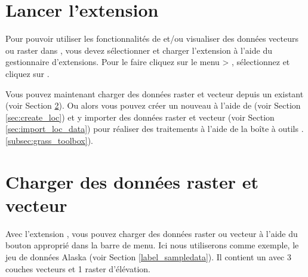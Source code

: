 \section{Lancer l'extension \grass}\label{sec:starting_grass}


Pour pouvoir utiliser les fonctionnalités de \grass et/ou visualiser des données vecteurs ou raster dans \qg, 
vous devez sélectionner et charger l'extension \grass à l'aide du gestionnaire d'extensions. 
Pour le faire cliquez sur le menu  > , 
sélectionnez \dropmenuopt{\grass} et cliquez sur .


Vous pouvez maintenant charger des données raster et vecteur depuis un  \grass existant (voir Section \ref{sec:load_grassdata}). Ou alors vous pouvez créer un nouveau  \grass à l'aide de \qg (voir Section \ref{sec:create_loc}) et y importer des données raster et vecteur (voir Section \ref{sec:import_loc_data}) pour réaliser des traitements à l'aide de la boîte à outils \grass.\ref{subsec:grass_toolbox}).

\section{Charger des données \grass raster et vecteur}\label{sec:load_grassdata}

Avec l'extension \grass, vous pouvez charger des données raster ou vecteur à l'aide 
du bouton approprié dans la barre de menu. Ici nous utiliserons comme exemple, 
le jeu de données \qg Alaska (voir Section \ref{label_sampledata}). 
Il contient un  \grass avec 3 couches vecteurs et 1 raster d'élévation.

